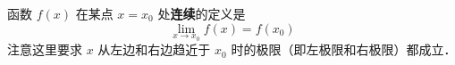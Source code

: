 

函数 $f(x)$ 在某点 $x = x_0$ 处\textbf{连续}的定义是
\begin{equation}
\lim_{x \to x_0} f(x) = f(x_0)
\end{equation}
注意这里要求 $x$ 从左边和右边趋近于 $x_0$ 时的极限（即左极限和右极限）都成立．

